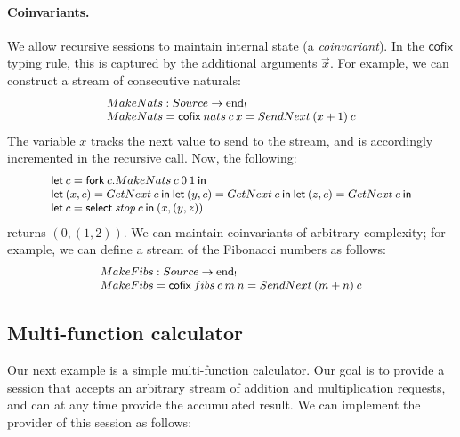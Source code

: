 \documentclass[orivec,envcountsame]{llncs}
\makeatletter
\newcommand{\uto}{\ensuremath{\rightarrow}}
\newcommand{\outterm}{\mathrm{end}_!}
\newcommand{\mkwd}[1]{\mathsf{#1}}
\newcommand{\clabel}[1]{\mathit{#1}}
\newcommand{\gvselect}[2]{\mkwd{select}\:#1\:#2}
\newcommand{\gvfork}[2]{\mkwd{fork}\:#1.#2}
\newcommand{\lrkwd}{\mkwd{cofix}}
\newcommand{\gvfix}[3]{\lrkwd\:#1\:#2 = #3}
\newcommand{\key}{\mkwd}
\newcommand{\cofix}{\lrkwd}
\newcommand{\ba}{\begin{array}}
\newcommand{\ea}{\end{array}}
\newcommand{\bl}{\ba[t]{@{}l@{}}}
\newcommand{\el}{\ea}
\makeatother
\begin{document}
\paragraph{Coinvariants.}

We allow recursive sessions to maintain internal state (a \emph{coinvariant}). In the $\cofix$
typing rule, this is captured by the additional arguments $\vec{x}$. For example, we can construct a
stream of consecutive naturals:
\[\small
\bl
  MakeNats : Source \uto \outterm \\
  MakeNats = \gvfix{nats}{c\:x}{SendNext\:(x + 1)\:c} \\
\el
\]
The variable $x$ tracks the next value to send to the stream, and is accordingly incremented in the
recursive call. Now, the following:
\[\small
\bl
\key{let}\:c = \gvfork{c}{MakeNats\:c\:0\:1}\:\key{in} \\
\key{let}\:(x, c) = GetNext\:c\:\key{in}\:
\key{let}\:(y, c) = GetNext\:c\:\key{in}\:
\key{let}\:(z, c) = GetNext\:c\:\key{in} \\
\key{let}\:c = \gvselect{\clabel{stop}}{c}\:\key{in}\:(x,(y,z)) \\
\el
\]
returns $(0, (1, 2))$.
%
We can maintain coinvariants of arbitrary complexity; for example, we can define a
stream of the Fibonacci numbers as follows:
\[\small
\bl
  MakeFibs : Source \uto \outterm \\
  MakeFibs = \gvfix{fibs}{c\:m\:n}{SendNext\:(m + n)\:c} \\
\el
\]

\subsection{Multi-function calculator}

Our next example is a simple multi-function calculator. Our goal is to provide a session that
accepts an arbitrary stream of addition and multiplication requests, and can at any time provide the
accumulated result.  We can implement the provider of this session as follows:
\end{document}
